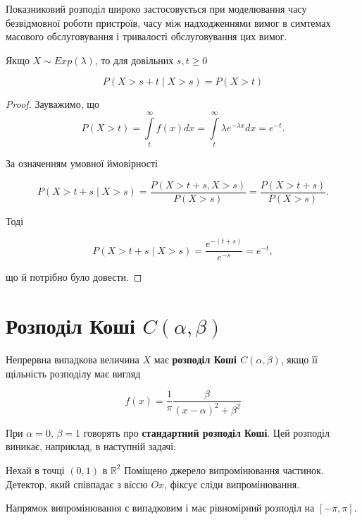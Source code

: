 Показниковий розподіл широко застосовується при моделювання часу безвідмовної роботи пристроїв,
часу між надходженнями вимог в симтемах масового обслуговування і тривалості обслуговування цих
вимог.

\begin{claim}
    Якщо $X \sim Exp(\lambda)$, то для довільних $s, t \geqslant 0$

    \begin{equation}
        P(X > s + t \mid X > s) = P(X > t)
    \end{equation}
\end{claim}
\begin{proof}
    Зауважимо, що
    $$P(X > t)
    = \int\limits_{t}^{\infty} f(x) dx
    = \int\limits_{t}^{\infty} \lambda e^{-\lambda x} dx
    = e^{-t}.$$

    За означенням умовної ймовірності

    $$P(X > t + s \mid X > s)
    = \frac{P(X > t + s, X > s)}{P(X > s)}
    = \frac{P(X > t + s)}{P(X > s)}.$$
    
    Тоді
    
    $$P(X > t + s \mid X > s)
    = \frac{e^{-(t+s)}}{e^{-s}}
    = e^{-t},$$
    
    що й потрібно було довести.
\end{proof}

\beautifulImage

\section{Розподіл Коші $C(\alpha, \beta)$}

Непрервна випадкова величина $X$ має \textbf{розподіл Коші $C(\alpha, \beta)$},
якщо її щільність розподілу має вигляд

\begin{equation}
    f(x) = \frac{1}{\pi} \frac{\beta}{(x-\alpha)^2 + \beta^2}
\end{equation}


При $\alpha = 0$, $\beta = 1$ говорять про \textbf{стандартний розподіл Коші}.
Цей розподіл виникає, наприклад, в наступній задачі:

\begin{example}
    Нехай в точці $(0,1)$ в $\mathbb{R}^2$ Поміщено джерело випромінювання
    частинок. Детектор, який співпадає з віссю $Ox$,
    фіксує сліди випромінювання.
\end{example}

Напрямок випромінювання є випадковим і має рівномірний розподіл на $[-\pi, \pi]$.

